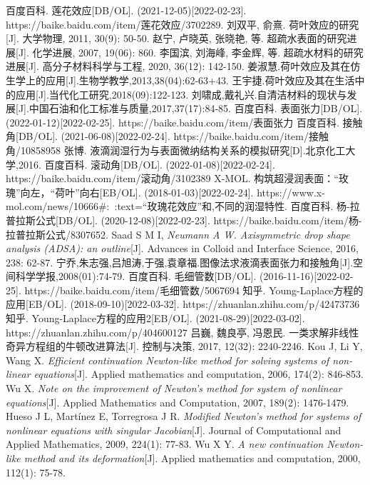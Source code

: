 \documentclass[a4paper,12pt]{article}%
\begin{document}
\newpage
\begin{thebibliography}{23}%
    百度百科. 莲花效应[DB/OL]. (2021-12-05)[2022-02-23]. https://baike.baidu.com/item/莲花效应/3702289.
    刘双平, 俞熹. 荷叶效应的研究[J]. 大学物理, 2011, 30(9): 50-50.
    赵宁, 卢晓英, 张晓艳, 等. 超疏水表面的研究进展[J]. 化学进展, 2007, 19(06): 860.
    李国滨, 刘海峰, 李金辉, 等. 超疏水材料的研究进展[J]. 高分子材料科学与工程, 2020, 36(12): 142-150.
    姜淑慧.荷叶效应及其在仿生学上的应用[J].生物学教学,2013,38(04):62-63+43.
    王宇捷.荷叶效应及其在生活中的应用[J].当代化工研究,2018(09):122-123.
    刘啸成,戴礼兴.自清洁材料的现状与发展[J].中国石油和化工标准与质量,2017,37(17):84-85.
    百度百科. 表面张力[DB/OL]. (2022-01-12)[2022-02-25]. https://baike.baidu.com/item/表面张力
    百度百科. 接触角[DB/OL]. (2021-06-08)[2022-02-24]. https://baike.baidu.com/item/接触角/10858958
    张博. 液滴润湿行为与表面微纳结构关系的模拟研究[D].北京化工大学,2016.
    百度百科. 滚动角[DB/OL]. (2022-01-08)[2022-02-24]. https://baike.baidu.com/item/滚动角/3102389
    X-MOL. 构筑超浸润表面：“玫瑰”向左，“荷叶”向右[EB/OL]. (2018-01-03)[2022-02-24]. https://www.x-mol.com/news/10666\#:~:text=“玫瑰花效应”和,不同的润湿特性.
    百度百科. 杨-拉普拉斯公式[DB/OL]. (2020-12-08)[2022-02-23]. https://baike.baidu.com/item/杨-拉普拉斯公式/8307652.
    Saad S M I, \textit{Neumann A W. Axisymmetric drop shape analysis (ADSA): an outline}[J]. Advances in Colloid and Interface Science, 2016, 238: 62-87.
    宁乔,朱志强,吕旭涛,于强,袁章福.图像法求液滴表面张力和接触角[J].空间科学学报,2008(01):74-79.
    百度百科. 毛细管数[DB/OL]. (2016-11-16)[2022-02-25]. https://baike.baidu.com/item/毛细管数/5067694
    知乎. Young-Laplace方程的应用[EB/OL]. (2018-09-10)[2022-03-32]. https://zhuanlan.zhihu.com/p/42473736
    知乎. Young-Laplace方程的应用2[EB/OL]. (2021-08-29)[2022-03-02]. https://zhuanlan.zhihu.com/p/404600127
    吕巍, 魏良亭, 冯恩民. 一类求解非线性奇异方程组的牛顿改进算法[J]. 控制与决策, 2017, 12(32): 2240-2246.
    Kou J, Li Y, Wang X. \textit{Efficient continuation Newton-like method for solving systems of non-linear equations}[J]. Applied mathematics and computation, 2006, 174(2): 846-853.
    Wu X. \textit{Note on the improvement of Newton’s method for system of nonlinear equations}[J]. Applied Mathematics and Computation, 2007, 189(2): 1476-1479.
    Hueso J L, Martínez E, Torregrosa J R. \textit{Modified Newton’s method for systems of nonlinear equations with singular Jacobian}[J]. Journal of Computational and Applied Mathematics, 2009, 224(1): 77-83.
    Wu X Y. \textit{A new continuation Newton-like method and its deformation}[J]. Applied mathematics and computation, 2000, 112(1): 75-78.
\end{thebibliography}
\end{document}
